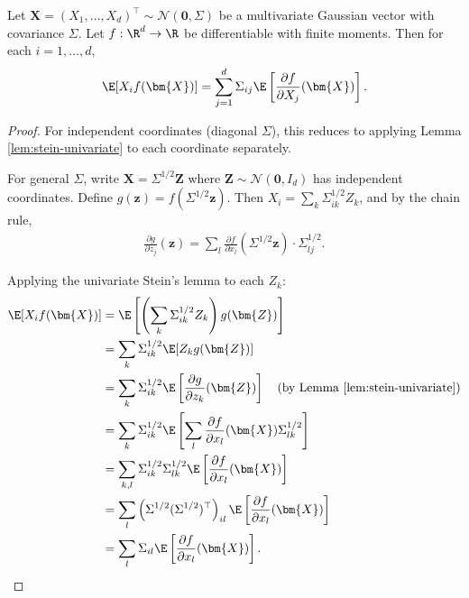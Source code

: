 \begin{lemma}\label{lem:stein-multivariate}
Let $\bm{X} = (X_1, \ldots, X_d)^\top \sim \mathcal{N}(\bm{0}, \Sigma)$ be a multivariate Gaussian vector with covariance $\Sigma$. Let $f: \R^d \to \R$ be differentiable with finite moments. Then for each $i = 1, \ldots, d$,
\begin{equation}\label{eq:stein-multivariate}
\E[X_i f(\bm{X})] = \sum_{j=1}^d \Sigma_{ij} \E\left[\frac{\partial f}{\partial X_j}(\bm{X})\right].
\end{equation}
\end{lemma}

\begin{proof}
For independent coordinates (diagonal $\Sigma$), this reduces to applying Lemma \ref{lem:stein-univariate} to each coordinate separately.

For general $\Sigma$, write $\bm{X} = \Sigma^{1/2} \bm{Z}$ where $\bm{Z} \sim \mathcal{N}(\bm{0}, I_d)$ has independent coordinates. Define $g(\bm{z}) = f(\Sigma^{1/2} \bm{z})$. Then $X_i = \sum_k \Sigma^{1/2}_{ik} Z_k$, and by the chain rule,
\begin{align}
\frac{\partial g}{\partial z_j}(\bm{z}) = \sum_l \frac{\partial f}{\partial x_l}(\Sigma^{1/2} \bm{z}) \cdot \Sigma^{1/2}_{lj}.
\end{align}

Applying the univariate Stein's lemma to each $Z_k$:
\begin{align}
\E[X_i f(\bm{X})]
&= \E\left[\left(\sum_k \Sigma^{1/2}_{ik} Z_k\right) g(\bm{Z})\right] \\
&= \sum_k \Sigma^{1/2}_{ik} \E[Z_k g(\bm{Z})] \\
&= \sum_k \Sigma^{1/2}_{ik} \E\left[\frac{\partial g}{\partial z_k}(\bm{Z})\right] \quad \text{(by Lemma \ref{lem:stein-univariate})} \\
&= \sum_k \Sigma^{1/2}_{ik} \E\left[\sum_l \frac{\partial f}{\partial x_l}(\bm{X}) \Sigma^{1/2}_{lk}\right] \\
&= \sum_{k,l} \Sigma^{1/2}_{ik} \Sigma^{1/2}_{lk} \E\left[\frac{\partial f}{\partial x_l}(\bm{X})\right] \\
&= \sum_l \left(\Sigma^{1/2} (\Sigma^{1/2})^\top\right)_{il} \E\left[\frac{\partial f}{\partial x_l}(\bm{X})\right] \\
&= \sum_l \Sigma_{il} \E\left[\frac{\partial f}{\partial x_l}(\bm{X})\right].
\end{align}
\end{proof}

